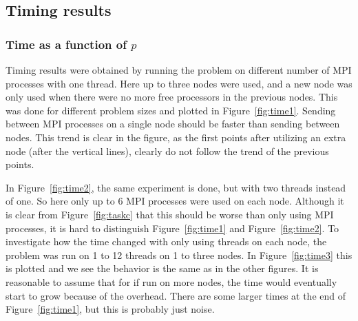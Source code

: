 \subsection{Timing results}
\subsubsection{Time as a function of $p$}
Timing results were obtained by running the problem on different number of MPI processes with one thread. Here up to three nodes were used, and a new node was only used when there were no more free processors in the previous nodes. This was done for different problem sizes and plotted in Figure~\ref{fig:time1}. Sending between MPI processes on a single node should be faster than sending between nodes. This trend is clear in the figure, as the first points after utilizing an extra node (after the vertical lines), clearly do not follow the trend of the previous points. 

In Figure~\ref{fig:time2}, the same experiment is done, but with two threads instead of one. So here only up to 6 MPI processes were used on each node. Although it is clear from Figure~\ref{fig:taskc} that this should be worse than only using MPI processes, it is hard to distinguish Figure~\ref{fig:time1} and Figure~\ref{fig:time2}. To investigate how the time changed with only using threads on each node, the problem was run on 1 to 12 threads on 1 to three nodes. In Figure~\ref{fig:time3} this is plotted and we see the behavior is the same as in the other figures. It is reasonable to assume that for if run on more nodes, the time would eventually start to grow because of the overhead. There are some larger times at the end of Figure~\ref{fig:time1}, but this is probably just noise.\\
%
\\
